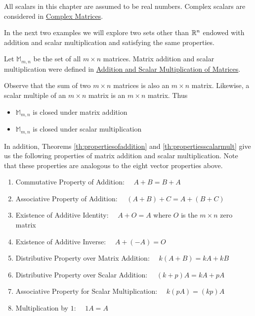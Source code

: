 \documentclass{ximera}
\begin{document}
  \begin{remark}
      All scalars in this chapter are assumed to be real numbers.  Complex scalars are considered in \href{https://ximera.osu.edu/linearalgebradzv3/LinearAlgebraInteractiveIntro/RTH-0050/main}{Complex Matrices}.
  \end{remark}

In the next two examples we will explore two sets other than $\mathbb{R}^n$ endowed with addition and scalar multiplication and satisfying the same properties.

\begin{example}\label{ex:setofmatricesvectorspace}
Let $\mathbb{M}_{m,n}$ be the set of all $m\times n$ matrices.  Matrix addition and scalar multiplication were defined in \href{https://ximera.osu.edu/linearalgebradzv3/LinearAlgebraInteractiveIntro/MAT-0010/main}{Addition and Scalar Multiplication of Matrices}.

Observe that the sum of two $m\times n$ matrices is also an $m\times n$ matrix. Likewise, a scalar multiple of an $m\times n$ matrix is an $m\times n$ matrix.  Thus 
\begin{itemize}
    \item[] $\mathbb{M}_{m,n}$ is closed under matrix addition
    \item[] $\mathbb{M}_{m,n}$ is closed under scalar multiplication
\end{itemize}

In addition, Theorems \ref{th:propertiesofaddition} and \ref{th:propertiesscalarmult} give us the following properties of matrix addition and scalar multiplication.  Note that these properties are analogous to the eight vector properties above.
\begin{enumerate}
  \item 
  Commutative Property of Addition:  $\quad A+B=B+A$
  \item 
  Associative Property of Addition: $\quad (A+B)+C=A+(B+C)$
  \item 
  Existence of Additive Identity:  $\quad A+O=A$ where $O$ is the $m \times n$ zero matrix
  \item 
  Existence of Additive Inverse:  $\quad A+(-A)=O$
  \item
  Distributive Property over Matrix Addition:  $\quad k(A+B)=kA+kB$
  \item
  Distributive Property over Scalar Addition:  $\quad (k+p)A=kA+pA$
  \item 
  Associative Property for Scalar Multiplication: $\quad k(pA)=(kp)A$
  \item 
  Multiplication by $1$: $\quad 1A=A$
  \end{enumerate}
\end{example}
\end{document}

